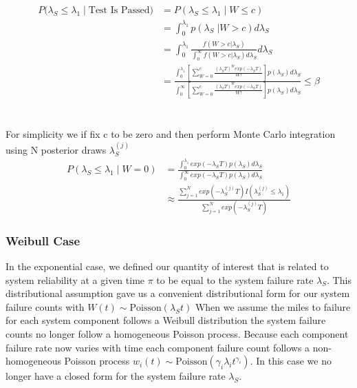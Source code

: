 \documentclass[12pt]{article}
\begin{document}
$$
\begin{aligned}
    P(\lambda_S \leq \lambda_1 \; \vert \; \text{Test Is Passed)} &= P(\lambda_S
    \leq \lambda_1 \; \vert \; W \leq c) \\ &= \int_{0}^{\lambda_1} p(\lambda_S \;
    \vert W > c) d\lambda_S \\ &= \int_{0}^{\lambda_1} \frac{f(W > c \vert
    \lambda_S)}{\int_{0}^{\infty} f(W > c \vert \lambda_S) d\lambda_S} d\lambda_S \\ &=
    \frac{\int_{0}^{\lambda_1} [ \sum_{W=0}^c \frac{(\lambda_S T)^W
    exp(-\lambda_S T)}{W!}]p(\lambda_S)d\lambda_S} {\int_{0}^{\infty} [
    \sum_{W=0}^c \frac{(\lambda_S T)^W exp(-\lambda_S
    T)}{W!}]p(\lambda_S)d\lambda_S} \leq \beta
\end{aligned}
$$
\\
\\
For simplicity we if fix c to be zero and then perform Monte Carlo integration
using N posterior draws $ \lambda_S^{(j)} $ $$
\begin{aligned}
	 P(\lambda_S \leq \lambda_1 \; \vert \; W = 0) &= \frac{\int_{0}^{\lambda_1}
	 exp(-\lambda_S T)p(\lambda_S)d\lambda_S} {\int_{0}^{\infty} exp(-\lambda_S
	 T)p(\lambda_S)d\lambda_S} \\ &\approx \frac{\sum_{j = 1}^{N}
	 exp(-\lambda_S^{(j)} T)I(\lambda_S^{(j)} \leq \lambda_1)} {\sum_{j = 1}^{N}
	 exp(-\lambda_S^{(j)} T)}
\end{aligned}
$$

\subsubsection{Weibull Case}
In the exponential case, we defined our quantity of interest that is related to
system reliability at a given time $\pi$ to be equal to the system failure rate
$\lambda_S$.  This distributional assumption gave us a convenient distributional
form for our system failure counts with $W(t) \sim \text{Poisson}(\lambda_S t)$
When we assume the miles to failure for each system component follows a Weibull
distribution the system failure counts no longer follow a homogeneous Poisson
process.  Because each component failure rate now varies with time each
component failure count follows a non-homogeneous Poisson process $w_i(t) \sim
\text{Poisson}(\gamma_i \lambda_i t^{\gamma_i})$.  In this case we no longer
have a closed form for the system failure rate $\lambda_S$.
\end{document}
